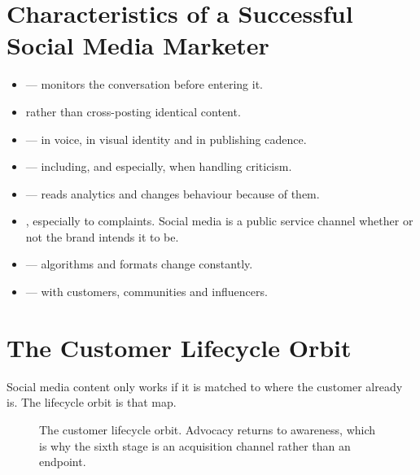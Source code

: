 \documentclass{MMTextbook}
\begin{document}
\section{Characteristics of a Successful Social Media Marketer}

\begin{itemize}
\item {} --- monitors the conversation before
      entering it.
\item {} rather than cross-posting
      identical content.
\item {} --- in voice, in visual identity and in publishing
      cadence.
\item {} --- including, and especially, when
      handling criticism.
\item {} --- reads analytics and changes behaviour because
      of them.
\item {}, especially to complaints. Social media is a public
      service channel whether or not the brand intends it to be.
\item {} --- algorithms and formats change
      constantly.
\item {} --- with customers, communities and
      influencers.
\end{itemize}

\section{The Customer Lifecycle Orbit}

Social media content only works if it is matched to where the customer already
is. The lifecycle orbit is that map.

\begin{figure}[htbp]
\centering
{}
\caption[The customer lifecycle orbit]%
        {The customer lifecycle orbit. Advocacy returns to awareness, which is
         why the sixth stage is an acquisition channel rather than an endpoint.}
\label{fig:orbit}
\end{figure}
\end{document}
